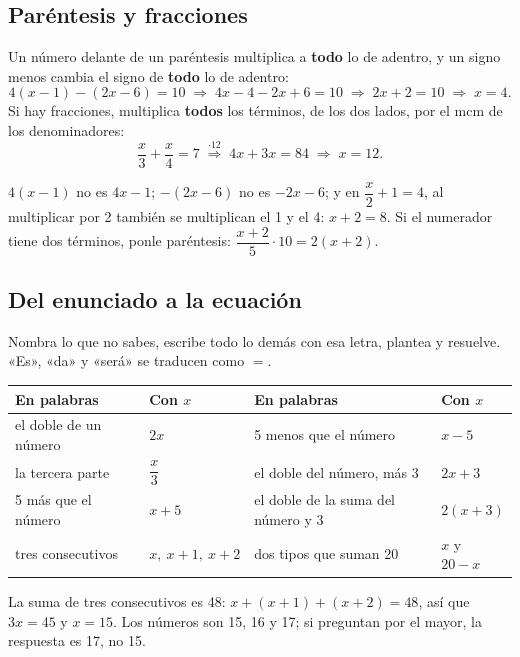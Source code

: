 \subsection{Paréntesis y fracciones}
Un número delante de un paréntesis multiplica a \textbf{todo} lo de adentro, y un signo menos cambia el signo de \textbf{todo} lo de adentro:
\[ 4(x - 1) - (2x - 6) = 10 \;\Rightarrow\; 4x - 4 - 2x + 6 = 10 \;\Rightarrow\; 2x + 2 = 10 \;\Rightarrow\; x = 4. \]
Si hay fracciones, multiplica \textbf{todos} los términos, de los dos lados, por el mcm de los denominadores:
\[ \frac{x}{3} + \frac{x}{4} = 7 \;\overset{\cdot 12}{\Longrightarrow}\; 4x + 3x = 84 \;\Rightarrow\; x = 12. \]
\begin{ojo} $4(x - 1)$ no es $4x - 1$; $-(2x - 6)$ no es $-2x - 6$; y en $\dfrac{x}{2} + 1 = 4$, al multiplicar por 2 también se multiplican el 1 y el 4: $x + 2 = 8$. Si el numerador tiene dos términos, ponle paréntesis: $\dfrac{x + 2}{5}\cdot 10 = 2(x + 2)$.\end{ojo}

\subsection{Del enunciado a la ecuación}
Nombra lo que no sabes, escribe todo lo demás con esa letra, plantea y resuelve. «Es», «da» y «será» se traducen como $=$.

\begin{center}
\begin{tabular}{@{}ll@{\qquad}ll@{}}
\toprule
En palabras & Con $x$ & En palabras & Con $x$\\ \midrule
el doble de un número & $2x$ & 5 menos que el número & $x - 5$\\
la tercera parte & $\dfrac{x}{3}$ & el doble del número, más 3 & $2x + 3$\\
5 más que el número & $x + 5$ & el doble de la suma del número y 3 & $2(x + 3)$\\
tres consecutivos & $x,\ x+1,\ x+2$ & dos tipos que suman 20 & $x$ y $20 - x$\\ \bottomrule
\end{tabular}
\end{center}
\begin{ejemplo} La suma de tres consecutivos es 48: $x + (x+1) + (x+2) = 48$, así que $3x = 45$ y $x = 15$. Los números son 15, 16 y 17; si preguntan por el mayor, la respuesta es 17, no 15.\end{ejemplo}

